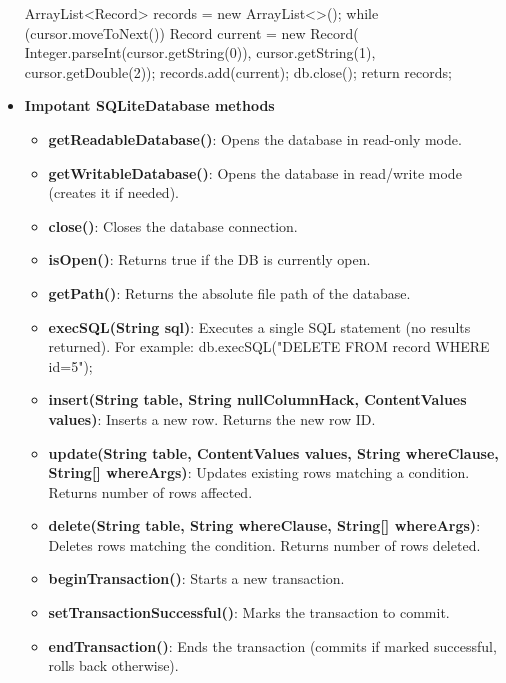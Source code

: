 \documentclass{report}
\begin{document}
\begin{itemize}
\begin{javacode}
{                    ArrayList<Record> records = new ArrayList<>();
                    while (cursor.moveToNext()) {
                        Record current = new Record(
                            Integer.parseInt(cursor.getString(0)),
                            cursor.getString(1),
                            cursor.getDouble(2));
                        records.add(current);
                    }
                    db.close();
                    return records;
                }
            \end{javacode}
        \item \textbf{Impotant SQLiteDatabase methods}
            \begin{itemize}
                \item \textbf{getReadableDatabase()}:	Opens the database in read-only mode.
                \item \textbf{getWritableDatabase()}:	Opens the database in read/write mode (creates it if needed).
                \item \textbf{close()}:	Closes the database connection.
                \item \textbf{isOpen()}:	Returns true if the DB is currently open.
                \item \textbf{getPath()}:	Returns the absolute file path of the database.
                \item \textbf{execSQL(String sql)}:	Executes a single SQL statement (no results returned). For example: db.execSQL("DELETE FROM record WHERE id=5");
                \item \textbf{insert(String table, String nullColumnHack, ContentValues values)}:	Inserts a new row. Returns the new row ID.
                \item \textbf{update(String table, ContentValues values, String whereClause, String[] whereArgs)}:	Updates existing rows matching a condition. Returns number of rows affected.
                \item \textbf{delete(String table, String whereClause, String[] whereArgs)}:	Deletes rows matching the condition. Returns number of rows deleted.
                \item \textbf{beginTransaction()}:	Starts a new transaction.
                \item \textbf{setTransactionSuccessful()}:	Marks the transaction to commit.
                \item \textbf{endTransaction()}:	Ends the transaction (commits if marked successful, rolls back otherwise).

\end{itemize}
\end{itemize}
\end{document}
